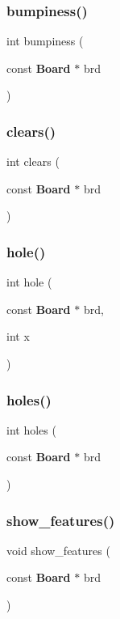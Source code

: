 \mbox{\label{tools_8c_aa5a5f3a20ab3b8a9894c2826b02f5a70}} 
\subsubsection{bumpiness()}
{\footnotesize\ttfamily int bumpiness (\begin{DoxyParamCaption}\item[{const \textbf{ Board} $\ast$}]{brd }\end{DoxyParamCaption})}

\mbox{\label{tools_8c_a60fe37bb659ce363f8e7dc89e221bc3a}} 
\subsubsection{clears()}
{\footnotesize\ttfamily int clears (\begin{DoxyParamCaption}\item[{const \textbf{ Board} $\ast$}]{brd }\end{DoxyParamCaption})}

\mbox{\label{tools_8c_aa78f4d6d22d659aad248e39e379361db}} 
\subsubsection{hole()}
{\footnotesize\ttfamily int hole (\begin{DoxyParamCaption}\item[{const \textbf{ Board} $\ast$}]{brd,  }\item[{int}]{x }\end{DoxyParamCaption})}

\mbox{\label{tools_8c_af5aed4274764b48658e2572c7f5fcd8c}} 
\subsubsection{holes()}
{\footnotesize\ttfamily int holes (\begin{DoxyParamCaption}\item[{const \textbf{ Board} $\ast$}]{brd }\end{DoxyParamCaption})}

\mbox{\label{tools_8c_a453fbdbb55f005553eadfe4e955a6183}} 
\subsubsection{show\+\_\+features()}
{\footnotesize\ttfamily void show\+\_\+features (\begin{DoxyParamCaption}\item[{const \textbf{ Board} $\ast$}]{brd }\end{DoxyParamCaption})}


